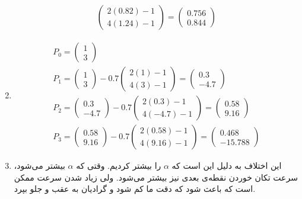 \begin{enumerate}
\begin{gather*}
\begin{pmatrix}
            2(0.82) - 1\\
            4(1.24) - 1
        \end{pmatrix}
        = \begin{pmatrix}
            0.756\\
            0.844
        \end{pmatrix}
    \end{gather*}
    \item \begin{gather*}
        P_0 = \begin{pmatrix}
            1\\
            3
        \end{pmatrix}\\
        P_1 = \begin{pmatrix}
            1\\
            3
        \end{pmatrix} - 0.7 \begin{pmatrix}
            2(1) - 1\\
            4(3) - 1
        \end{pmatrix}
        = \begin{pmatrix}
            0.3\\
            -4.7
        \end{pmatrix}\\
        P_2 = \begin{pmatrix}
            0.3\\
            -4.7
        \end{pmatrix} - 0.7 \begin{pmatrix}
            2(0.3) - 1\\
            4(-4.7) - 1
        \end{pmatrix}
        = \begin{pmatrix}
            0.58\\
            9.16
        \end{pmatrix}\\
        P_3 = \begin{pmatrix}
            0.58\\
            9.16
        \end{pmatrix} - 0.7 \begin{pmatrix}
            2(0.58) - 1\\
            4(9.16) - 1
        \end{pmatrix}
        = \begin{pmatrix}
            0.468\\
            -15.788
        \end{pmatrix}
    \end{gather*}
    \item این اختلاف به دلیل این است که $\alpha$ را بیشتر کردیم. وقتی که $\alpha$ بیشتر می‌شود، سرعت تکان خوردن نقطه‌ی بعدی
    نیز بیشتر می‌شود. ولی زیاد شدن سرعت ممکن است که باعث شود که دقت ما کم شود و گرادیان به عقب و جلو بپرد.
\end{enumerate}